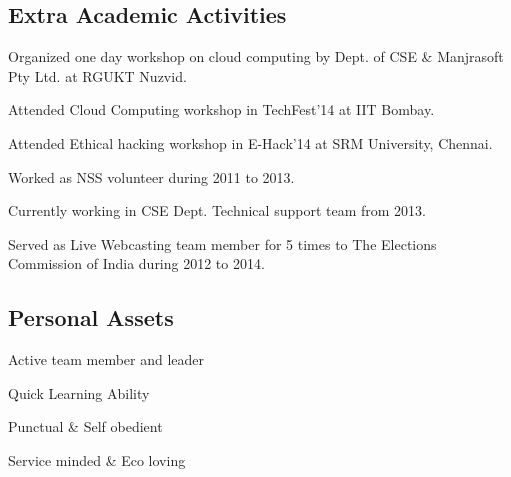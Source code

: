 \documentclass[10pt]{article}
\begin{document}
\subsection*{Extra Academic Activities}
\onehalfspacing
\begin{compactitem}
	\item Organized one day workshop on cloud computing by Dept. of CSE \& Manjrasoft Pty Ltd. at RGUKT Nuzvid.
	\item Attended Cloud Computing workshop in TechFest'14 at IIT Bombay. 
	\item Attended Ethical hacking workshop in E-Hack'14 at SRM University, Chennai.
	\item Worked as NSS volunteer during 2011 to 2013.
	\item Currently working in CSE Dept. Technical support team from 2013. 
	\item Served as Live Webcasting team member for 5 times to The Elections Commission of India during 2012 to 2014.
\end{compactitem}

\subsection*{Personal Assets}
\onehalfspacing
\begin{multicols}{2}
\begin{compactitem}
	\item Active team member and leader
	\item Quick Learning Ability
	\item Punctual \& Self obedient
	\item Service minded \& Eco loving
\end{compactitem}
\end{multicols}
\end{document}
